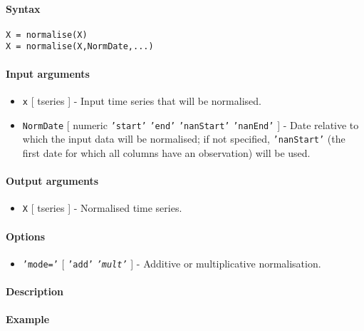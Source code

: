 


	\paragraph{Syntax}\label{syntax}

\begin{verbatim}
X = normalise(X)
X = normalise(X,NormDate,...)
\end{verbatim}

\paragraph{Input arguments}\label{input-arguments}

\begin{itemize}
\item
  \texttt{x} {[} tseries {]} - Input time series that will be
  normalised.
\item
  \texttt{NormDate} {[} numeric \textbar{} \texttt{'start'} \textbar{}
  \texttt{'end'} \textbar{} \texttt{'nanStart'} \textbar{}
  \texttt{'nanEnd'} {]} - Date relative to which the input data will be
  normalised; if not specified, \texttt{'nanStart'} (the first date for
  which all columns have an observation) will be used.
\end{itemize}

\paragraph{Output arguments}\label{output-arguments}

\begin{itemize}
\itemsep1pt\parskip0pt
\item
  \texttt{X} {[} tseries {]} - Normalised time series.
\end{itemize}

\paragraph{Options}\label{options}

\begin{itemize}
\itemsep1pt\parskip0pt
\item
  \texttt{'mode='} {[} \texttt{'add'} \textbar{} \emph{\texttt{'mult'}}
  {]} - Additive or multiplicative normalisation.
\end{itemize}

\paragraph{Description}\label{description}

\paragraph{Example}\label{example}


